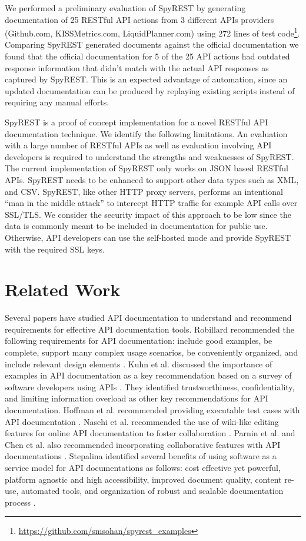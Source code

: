 \documentclass[conference]{IEEEtran}
\begin{document}
We performed a preliminary evaluation of SpyREST by generating documentation of 25 RESTful API actions from 3 different APIs providers (Github.com, KISSMetrics.com, LiquidPlanner.com) using 272 lines of test code\footnote{\url{https://github.com/smsohan/spyrest_examples}}. Comparing SpyREST generated documents against the official documentation we found that the official documentation for 5 of the 25 API actions had outdated response information that didn't match with the actual API responses as captured by SpyREST. This is an expected advantage of automation, since an updated documentation can be produced by replaying existing scripts instead of requiring any manual efforts.

SpyREST is a proof of concept implementation for a novel RESTful API documentation technique. We identify the following limitations. An evaluation with a large number of RESTful APIs as well as evaluation involving API developers is required to understand the strengths and weaknesses of SpyREST. The current implementation of SpyREST only works on JSON based RESTful APIs. SpyREST needs to be enhanced to support other data types such as XML, and CSV. SpyREST, like other HTTP proxy servers, performs an intentional ``man in the middle attack'' to intercept HTTP traffic for example API calls over SSL/TLS. We consider the security impact of this approach to be low since the data is commonly meant to be included in documentation for public use. Otherwise, API developers can use the self-hosted mode and provide SpyREST with the required SSL keys.


\section{Related Work}
Several papers have studied API documentation to understand and recommend requirements for effective API documentation tools. Robillard recommended the following requirements for API documentation: include good examples, be complete, support many complex usage scenarios, be conveniently organized, and include relevant design elements \cite{Robillard_what_makes, Robillard_a_field_study}. Kuhn et al. discussed the importance of examples in API documentation as a key recommendation based on a survey of software developers using APIs \cite{Kuhn_on_designing}. They identified trustworthiness, confidentiality, and limiting information overload as other key recommendations for API documentation. Hoffman et al. recommended providing executable test cases with API documentation \cite{Hoffman_api_documentation}. Nasehi et al. recommended the use of wiki-like editing features for online API documentation to foster collaboration \cite{Nasehi_what_makes}. Parnin et al. and Chen et al. also recommended incorporating collaborative features with API documentations \cite{Parnin_measuring, Chen_who_asked}. Stepalina identified several benefits of using software as a service model for API documentations as follows: cost effective yet powerful, platform agnostic and high accessibility, improved document quality, content re-use, automated tools, and organization of robust and scalable documentation process \cite{Stepalina_saas}.
\end{document}
